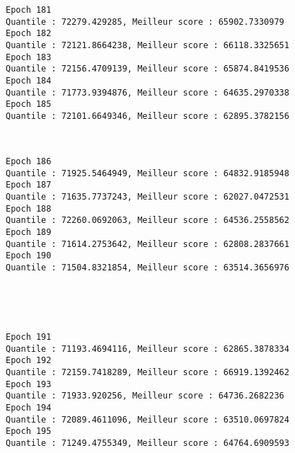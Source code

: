 \documentclass[11pt]{article}
\begin{document}
    \begin{Verbatim}[commandchars=\\\{\}]
Epoch 181
Quantile : 72279.429285, Meilleur score : 65902.7330979
Epoch 182
Quantile : 72121.8664238, Meilleur score : 66118.3325651
Epoch 183
Quantile : 72156.4709139, Meilleur score : 65874.8419536
Epoch 184
Quantile : 71773.9394876, Meilleur score : 64635.2970338
Epoch 185
Quantile : 72101.6649346, Meilleur score : 62895.3782156

    \end{Verbatim}

    \begin{center}
    \end{center}
    { \hspace*{\fill} \\}
    
    \begin{Verbatim}[commandchars=\\\{\}]
Epoch 186
Quantile : 71925.5464949, Meilleur score : 64832.9185948
Epoch 187
Quantile : 71635.7737243, Meilleur score : 62027.0472531
Epoch 188
Quantile : 72260.0692063, Meilleur score : 64536.2558562
Epoch 189
Quantile : 71614.2753642, Meilleur score : 62808.2837661
Epoch 190
Quantile : 71504.8321854, Meilleur score : 63514.3656976

    \end{Verbatim}

    \begin{center}
    \end{center}
    { \hspace*{\fill} \\}
    
    \begin{center}
    \end{center}
    { \hspace*{\fill} \\}
    
    \begin{Verbatim}[commandchars=\\\{\}]
Epoch 191
Quantile : 71193.4694116, Meilleur score : 62865.3878334
Epoch 192
Quantile : 72159.7418289, Meilleur score : 66919.1392462
Epoch 193
Quantile : 71933.920256, Meilleur score : 64736.2682236
Epoch 194
Quantile : 72089.4611096, Meilleur score : 63510.0697824
Epoch 195
Quantile : 71249.4755349, Meilleur score : 64764.6909593

    \end{Verbatim}
\end{document}
